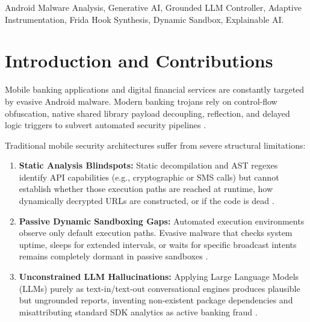 \documentclass[conference]{IEEEtran}
\begin{document}
\begin{IEEEkeywords}
Android Malware Analysis, Generative AI, Grounded LLM Controller, Adaptive Instrumentation, Frida Hook Synthesis, Dynamic Sandbox, Explainable AI.
\end{IEEEkeywords}

\section{Introduction and Contributions}
Mobile banking applications and digital financial services are constantly targeted by evasive Android malware. Modern banking trojans rely on control-flow obfuscation, native shared library payload decoupling, reflection, and delayed logic triggers to subvert automated security pipelines \cite{b1, b3}.

Traditional mobile security architectures suffer from severe structural limitations:
\begin{enumerate}
    \item \textbf{Static Analysis Blindspots:} Static decompilation and AST regexes identify API capabilities (e.g., cryptographic or SMS calls) but cannot establish whether those execution paths are reached at runtime, how dynamically decrypted URLs are constructed, or if the code is dead \cite{b2}.
    \item \textbf{Passive Dynamic Sandboxing Gaps:} Automated execution environments observe only default execution paths. Evasive malware that checks system uptime, sleeps for extended intervals, or waits for specific broadcast intents remains completely dormant in passive sandboxes \cite{b7}.
    \item \textbf{Unconstrained LLM Hallucinations:} Applying Large Language Models (LLMs) purely as text-in/text-out conversational engines produces plausible but ungrounded reports, inventing non-existent package dependencies and misattributing standard SDK analytics as active banking fraud \cite{b15}.
\end{enumerate}
\end{document}
